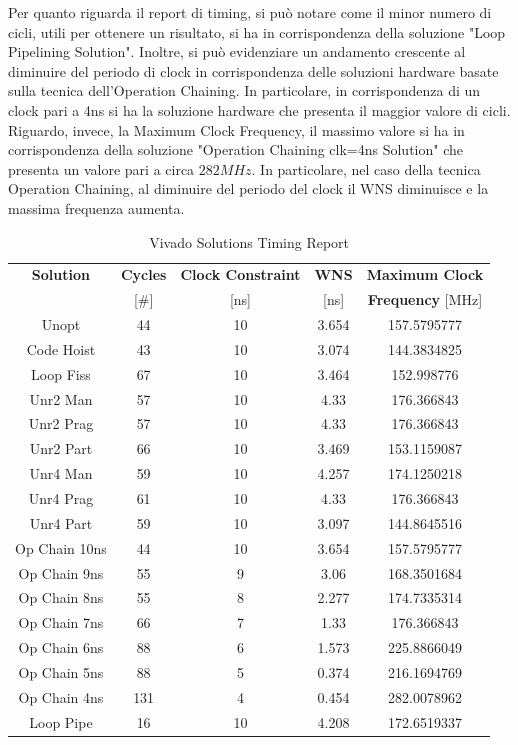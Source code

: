 Per quanto riguarda il report di timing, si può notare come il minor numero di cicli, utili per ottenere un risultato, si ha in corrispondenza della soluzione "Loop Pipelining Solution". Inoltre, si può evidenziare un andamento crescente al diminuire del periodo di clock in corrispondenza delle soluzioni hardware basate sulla tecnica dell'Operation Chaining. In particolare, in corrispondenza di un clock pari a 4ns si ha la soluzione hardware che presenta il maggior valore di cicli.
\\
Riguardo, invece, la Maximum Clock Frequency, il massimo valore si ha in corrispondenza della soluzione "Operation Chaining clk=4ns Solution" che presenta un valore pari a circa $282 MHz$. In particolare, nel caso della tecnica Operation Chaining, al diminuire del periodo del clock il WNS diminuisce e la massima frequenza aumenta.

\begin{table}[H]
	\centering
	\begin{tabular}{|c|c|c|c|c|}
		\hline
		\textbf{Solution} & \textbf{Cycles} & \textbf{Clock Constraint} & \textbf{WNS} & \textbf{Maximum Clock}\\
		& [\#] & [ns] & [ns] & \textbf{Frequency} [MHz]\\
		\hline
		Unopt & 44 & 10 & 3.654 & 157.5795777\\
		Code Hoist & 43 & 10 & 3.074 & 144.3834825\\
		Loop Fiss & 67 & 10 & 3.464 & 152.998776\\
		Unr2 Man & 57 & 10 & 4.33 & 176.366843\\
		Unr2 Prag & 57 & 10 & 4.33 & 176.366843\\
		Unr2 Part & 66 & 10 & 3.469 & 153.1159087\\
		Unr4 Man & 59 & 10 & 4.257 & 174.1250218\\
		Unr4 Prag & 61 & 10 & 4.33 & 176.366843\\
		Unr4 Part & 59 & 10 & 3.097 & 144.8645516\\
		Op Chain 10ns & 44 & 10 & 3.654 & 157.5795777\\
		Op Chain 9ns & 55 & 9 & 3.06 & 168.3501684\\
		Op Chain 8ns & 55 & 8 & 2.277 & 174.7335314\\
		Op Chain 7ns & 66 & 7 & 1.33 & 176.366843\\
		Op Chain 6ns & 88 & 6 & 1.573 & 225.8866049\\
		Op Chain 5ns & 88 & 5 & 0.374 & 216.1694769\\
		Op Chain 4ns & 131 & 4 & 0.454 & 282.0078962\\
		Loop Pipe & 16 & 10 & 4.208 & 172.6519337\\
		\hline
	\end{tabular}
	\caption{Vivado Solutions Timing Report}
	\label{tab:vivado-solutions-timing-report}
\end{table}

